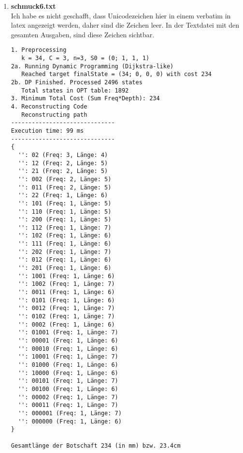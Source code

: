 \documentclass[a4paper,10pt,ngerman]{scrartcl}
\begin{document}
\begin{enumerate}
  \item \textbf{schmuck6.txt}
  \\
  Ich habe es nicht geschafft, dass Unicodezeichen hier in einem verbatim in latex angezeigt werden, daher sind die Zeichen leer. In der Textdatei mit den gesamten Ausgaben, sind diese Zeichen sichtbar.
  \begin{verbatim}
1. Preprocessing
   k = 34, C = 3, n=3, S0 = (0; 1, 1, 1)
2a. Running Dynamic Programming (Dijkstra-like)
   Reached target finalState = (34; 0, 0, 0) with cost 234
2b. DP Finished. Processed 2496 states
   Total states in OPT table: 1892
3. Minimum Total Cost (Sum Freq*Depth): 234
4. Reconstructing Code
   Reconstructing path
------------------------------
Execution time: 99 ms
------------------------------
{
  '': 02 (Freq: 3, Länge: 4)
  '': 12 (Freq: 2, Länge: 5)
  '': 21 (Freq: 2, Länge: 5)
  '': 002 (Freq: 2, Länge: 5)
  '': 011 (Freq: 2, Länge: 5)
  '': 22 (Freq: 1, Länge: 6)
  '': 101 (Freq: 1, Länge: 5)
  '': 110 (Freq: 1, Länge: 5)
  '': 200 (Freq: 1, Länge: 5)
  '': 112 (Freq: 1, Länge: 7)
  '': 102 (Freq: 1, Länge: 6)
  '': 111 (Freq: 1, Länge: 6)
  '': 202 (Freq: 1, Länge: 7)
  '': 012 (Freq: 1, Länge: 6)
  '': 201 (Freq: 1, Länge: 6)
  '': 1001 (Freq: 1, Länge: 6)
  '': 1002 (Freq: 1, Länge: 7)
  '': 0011 (Freq: 1, Länge: 6)
  '': 0101 (Freq: 1, Länge: 6)
  '': 0012 (Freq: 1, Länge: 7)
  '': 0102 (Freq: 1, Länge: 7)
  '': 0002 (Freq: 1, Länge: 6)
  '': 01001 (Freq: 1, Länge: 7)
  '': 00001 (Freq: 1, Länge: 6)
  '': 00010 (Freq: 1, Länge: 6)
  '': 10001 (Freq: 1, Länge: 7)
  '': 01000 (Freq: 1, Länge: 6)
  '': 10000 (Freq: 1, Länge: 6)
  '': 00101 (Freq: 1, Länge: 7)
  '': 00100 (Freq: 1, Länge: 6)
  '': 00002 (Freq: 1, Länge: 7)
  '': 00011 (Freq: 1, Länge: 7)
  '': 000001 (Freq: 1, Länge: 7)
  '': 000000 (Freq: 1, Länge: 6)
}

Gesamtlänge der Botschaft 234 (in mm) bzw. 23.4cm


\end{verbatim}
\end{enumerate}
\end{document}
